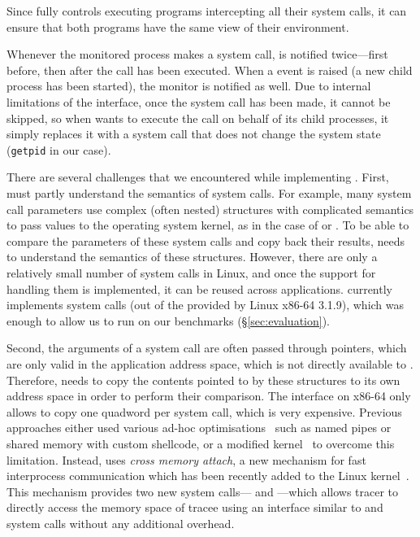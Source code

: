 Since \mxm fully controls executing programs intercepting all their
system calls, it can ensure that both programs have the same view of
their environment.

Whenever the monitored process makes a system call, \mxm is notified
twice---first before, then after the call has been executed.  When a
\ptrace event is raised (\eg a new child process has been started),
the monitor is notified as well.  Due to internal limitations of the
\ptrace interface, once the system call has been made, it cannot be
skipped, so when \mxm wants to execute the call on behalf of its child
processes, it simply replaces it with a system call that does not
change the system state (\texttt{getpid} in our case).

There are several challenges that we encountered while implementing
\mxm.  First, \mxm must partly understand the semantics of 
system calls.  For example, many system call parameters use complex
(often nested) structures with complicated semantics to pass values to
the operating system kernel, as in the case of  or
.  To be able to compare the parameters of
these system calls and copy back their results, \mxm needs to
understand the semantics of these structures.  However, there are only
a relatively small number of system calls in Linux, and once the support
for handling them is implemented, it can be reused across applications.
\mxm currently implements \syscallsImplemented system calls (out of the
\syscallsTotal provided by Linux x86-64 3.1.9), which was enough to
allow us to run \mx on our benchmarks
(\S\ref{sec:evaluation}).

Second, the arguments of a system call are often passed through pointers,
which are only valid in the application address space, which is not directly
available to \mxm.  Therefore, \mxm needs to copy the contents pointed to by
these structures to its own address space in order to perform their
comparison.  The \ptrace interface on x86-64 only allows to copy one quadword
per system call, which is very expensive. Previous approaches either used
various ad-hoc optimisations~\cite{orchestra09} such as named pipes or shared
memory with custom shellcode, or a modified kernel~\cite{tachyon12} to
overcome this limitation. Instead, \mxm uses \emph{cross memory attach}, a new
mechanism for fast interprocess communication which has been recently added to
the Linux kernel~\cite{crossmemoryattach}.  This mechanism provides two new
system calls--- and
---which allows tracer to directly access the
memory space of tracee using an interface similar to  and
 system calls without any additional overhead.

